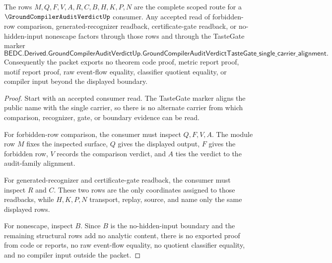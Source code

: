 \begin{theorem}
\label{thm:ground-compiler-audit-verdict-boundary-exactness}
The rows $M,Q,F,V,A,R,C,B,H,K,P,N$ are the complete scoped route for a $\GroundCompilerAuditVerdictUp$ consumer. Any accepted read of forbidden-row comparison, generated-recognizer readback, certificate-gate readback, or no-hidden-input nonescape factors through those rows and through the TasteGate marker
$$
\mathsf{BEDC.Derived.GroundCompilerAuditVerdictUp.GroundCompilerAuditVerdictTasteGate\_single\_carrier\_alignment}.
$$
Consequently the packet exports no theorem code proof, metric report proof, motif report proof, raw event-flow equality, classifier quotient equality, or compiler input beyond the displayed boundary.
\end{theorem}
\begin{proof}
Start with an accepted consumer read. The TasteGate marker aligns the public name with the single carrier, so there is no alternate carrier from which comparison, recognizer, gate, or boundary evidence can be read.

For forbidden-row comparison, the consumer must inspect $Q,F,V,A$. The module row $M$ fixes the inspected surface, $Q$ gives the displayed output, $F$ gives the forbidden row, $V$ records the comparison verdict, and $A$ ties the verdict to the audit-family alignment.

For generated-recognizer and certificate-gate readback, the consumer must inspect $R$ and $C$. These two rows are the only coordinates assigned to those readbacks, while $H,K,P,N$ transport, replay, source, and name only the same displayed rows.

For nonescape, inspect $B$. Since $B$ is the no-hidden-input boundary and the remaining structural rows add no analytic content, there is no exported proof from code or reports, no raw event-flow equality, no quotient classifier equality, and no compiler input outside the packet.
\end{proof}


